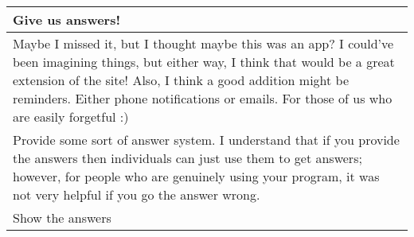 \begin{longtable}{|p{1\linewidth}|}
		\hline
		Give us answers!                                                                                                                                                                                                                                                                                                                                                                                                                                                                                                                                                                                                                                                                                 \\
		\hline
		Maybe I missed it, but I thought maybe this was an app? I could've been imagining things, but either way, I think that would be a great extension of the site! Also, I think a good addition might be reminders. Either phone notifications or emails. For those of us who are easily forgetful :)                                                                                                                                                                                                                                                                                                                                                                                               \\
		\hline
		Provide some sort of answer system. I understand that if you provide the answers then individuals can just use them to get answers; however, for people who are genuinely using your program, it was not very helpful if you go the answer wrong.                                                                                                                                                                                                                                                                                                                                                                                                                                                \\
		\hline
		Show the answers                                                                                                                                                                                                                                                                                                                                                                                                                                                                                                                                                                                                                                                                                 \\

\end{longtable}
